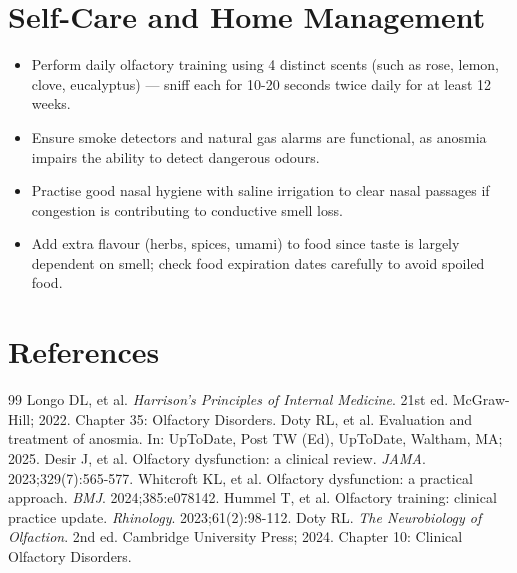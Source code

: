 \section*{Self-Care and Home Management}
\begin{itemize}
  \item Perform daily olfactory training using 4 distinct scents (such as rose, lemon, clove, eucalyptus) — sniff each for 10-20 seconds twice daily for at least 12 weeks.
  \item Ensure smoke detectors and natural gas alarms are functional, as anosmia impairs the ability to detect dangerous odours.
  \item Practise good nasal hygiene with saline irrigation to clear nasal passages if congestion is contributing to conductive smell loss.
  \item Add extra flavour (herbs, spices, umami) to food since taste is largely dependent on smell; check food expiration dates carefully to avoid spoiled food.
\end{itemize}

\section*{References}

\begin{thebibliography}{99}
 Longo DL, et al. \emph{Harrison's Principles of Internal Medicine}. 21st ed. McGraw-Hill; 2022. Chapter 35: Olfactory Disorders.
 Doty RL, et al. Evaluation and treatment of anosmia. In: UpToDate, Post TW (Ed), UpToDate, Waltham, MA; 2025.
 Desir J, et al. Olfactory dysfunction: a clinical review. \emph{JAMA}. 2023;329(7):565-577.
 Whitcroft KL, et al. Olfactory dysfunction: a practical approach. \emph{BMJ}. 2024;385:e078142.
 Hummel T, et al. Olfactory training: clinical practice update. \emph{Rhinology}. 2023;61(2):98-112.
 Doty RL. \emph{The Neurobiology of Olfaction}. 2nd ed. Cambridge University Press; 2024. Chapter 10: Clinical Olfactory Disorders.
\end{thebibliography}
